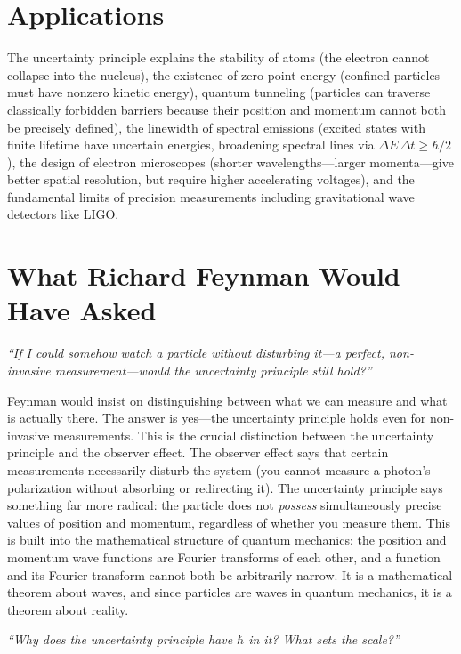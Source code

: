 \section*{Applications}

The uncertainty principle explains the stability of atoms (the electron cannot collapse into the nucleus), the existence of zero-point energy (confined particles must have nonzero kinetic energy), quantum tunneling (particles can traverse classically forbidden barriers because their position and momentum cannot both be precisely defined), the linewidth of spectral emissions (excited states with finite lifetime have uncertain energies, broadening spectral lines via $\Delta E\,\Delta t \geq \hbar/2$), the design of electron microscopes (shorter wavelengths---larger momenta---give better spatial resolution, but require higher accelerating voltages), and the fundamental limits of precision measurements including gravitational wave detectors like LIGO.
\section*{What Richard Feynman Would Have Asked}

\textit{``If I could somehow watch a particle without disturbing it---a perfect, non-invasive measurement---would the uncertainty principle still hold?''}

Feynman would insist on distinguishing between what we can measure and what is actually there. The answer is yes---the uncertainty principle holds even for non-invasive measurements. This is the crucial distinction between the uncertainty principle and the observer effect. The observer effect says that certain measurements necessarily disturb the system (you cannot measure a photon's polarization without absorbing or redirecting it). The uncertainty principle says something far more radical: the particle does not \emph{possess} simultaneously precise values of position and momentum, regardless of whether you measure them. This is built into the mathematical structure of quantum mechanics: the position and momentum wave functions are Fourier transforms of each other, and a function and its Fourier transform cannot both be arbitrarily narrow. It is a mathematical theorem about waves, and since particles are waves in quantum mechanics, it is a theorem about reality.

\textit{``Why does the uncertainty principle have $\hbar$ in it? What sets the scale?''}

